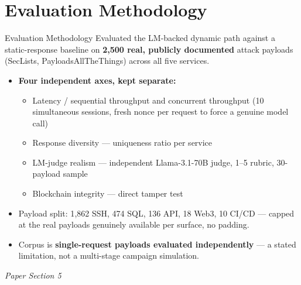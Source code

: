 \documentclass[aspectratio=169, 11pt]{beamer}
\newcommand{\srcnote}[1]{{\footnotesize\color{gray}\textit{#1}}}
\begin{document}
\section{Evaluation Methodology}
\begin{frame}{Evaluation Methodology}
    Evaluated the LM-backed dynamic path against a static-response baseline on \textbf{2{,}500 real, publicly documented} attack payloads (SecLists, PayloadsAllTheThings) across all five services.
    \begin{itemize}
        \item \textbf{Four independent axes, kept separate:}
        \begin{itemize}
            \item Latency / sequential throughput and concurrent throughput (10 simultaneous sessions, fresh nonce per request to force a genuine model call)
            \item Response diversity --- uniqueness ratio per service
            \item LM-judge realism --- independent Llama-3.1-70B judge, 1--5 rubric, 30-payload sample
            \item Blockchain integrity --- direct tamper test
        \end{itemize}
        \item Payload split: 1{,}862 SSH, 474 SQL, 136 API, 18 Web3, 10 CI/CD --- capped at the real payloads genuinely available per surface, no padding.
        \item Corpus is \textbf{single-request payloads evaluated independently} --- a stated limitation, not a multi-stage campaign simulation.
    \end{itemize}
    \srcnote{Paper Section 5}
\end{frame}
\end{document}
